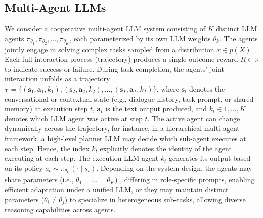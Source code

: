 \documentclass[]{fairmeta}
\theoremstyle{plain}
\theoremstyle{definition}
\theoremstyle{remark}
\begin{document}
\subsection{Multi-Agent LLMs}
We consider a cooperative multi-agent LLM system consisting of $K$ distinct LLM agents ${\pi_{\theta_1}, \pi_{\theta_2}, \dots, \pi_{\theta_K}}$, each parameterized by its own LLM weights $\theta_k$. The agents jointly engage in solving complex tasks sampled from a distribution $x\in p(X)$. Each full interaction process (trajectory) produces a single outcome reward $R \in \mathbb{R}$ to indicate success or failure. During task completion, the agents’ joint interaction unfolds as a trajectory $\bm{\tau} = \{(\bm{s}_1, \bm{a}_1, k_1), (\bm{s}_2, \bm{a}_2, k_2), \dots, (\bm{s}_T, \bm{a}_T, k_T)\}$, where $\bm{s}_t$ denotes the conversational or contextual state (e.g., dialogue history, task prompt, or shared memory) at execution step $t$, $\bm{a}_t$ is the text output produced, and $k_t \in {1,\dots,K}$ denotes which LLM agent was active at step $t$. The active agent can change dynamically across the trajectory, for instance, in a hierarchical multi-agent framework, a high-level planner LLM may decide which sub-agent executes at each step. Hence, the index $k_t$ explicitly denotes the identity of the agent executing at each step. The execution LLM agent $k_t$ generates its output based on its policy $a_t \sim \pi_{\theta_{k_t}}(\cdot \mid s_t)$. Depending on the system design, the agents may share parameters (i.e., $\theta_1 = \dots = \theta_K$) , differing in role-specific prompts, enabling efficient adaptation under a unified LLM, or they may maintain distinct parameters ($\theta_i \neq \theta_j$) to specialize in heterogeneous sub-tasks, allowing diverse reasoning capabilities across agents.
\end{document}
